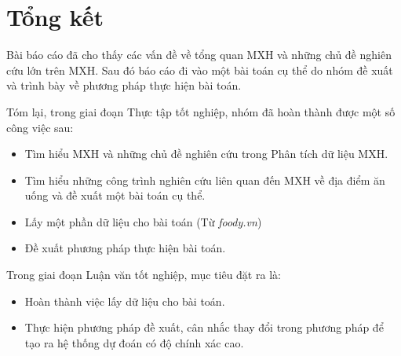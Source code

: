 \documentclass[12pt]{extarticle}
\begin{document}
	\section{Tổng kết}
		\par Bài báo cáo đã cho thấy các vấn đề về tổng quan MXH và những chủ đề nghiên cứu lớn trên MXH. Sau đó báo cáo đi vào một bài toán cụ thể do nhóm đề xuất và trình bày về phương pháp thực hiện bài toán.
		\par Tóm lại, trong giai đoạn Thực tập tốt nghiệp, nhóm đã hoàn thành được một số công việc sau:
		\begin{itemize}
			\item Tìm hiểu MXH và những chủ đề nghiên cứu trong Phân tích dữ liệu MXH.
			\item Tìm hiểu những công trình nghiên cứu liên quan đến MXH về địa điểm ăn uống và đề xuất một bài toán cụ thể. 
			\item Lấy một phần dữ liệu cho bài toán (Từ \textit{foody.vn})
			\item Đề xuất phương pháp thực hiện bài toán.
		\end{itemize}

		\par Trong giai đoạn Luận văn tốt nghiệp, mục tiêu đặt ra là:

		\begin{itemize}
			\item Hoàn thành việc lấy dữ liệu cho bài toán.
			\item Thực hiện phương pháp đề xuất, cân nhắc thay đổi trong phương pháp để tạo ra hệ thống dự đoán có độ chính xác cao. 
		\end{itemize}
		\newpage
\end{document}
